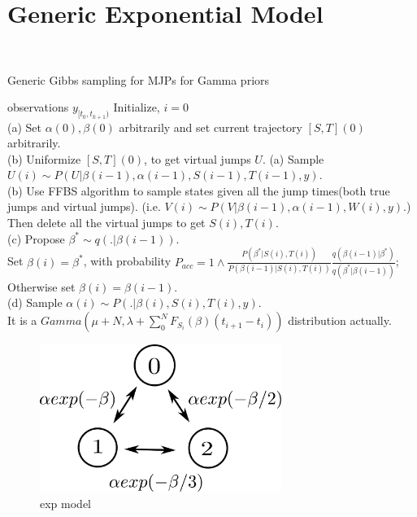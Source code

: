 
\section{Generic Exponential Model}~
\begin{algorithm}[!ht]
   \caption{Generic Gibbs sampling for MJPs for Gamma priors}
   \label{alg:Generic Gibbs}
\begin{algorithmic}
    observations $y_{[t_0, t_{k+1})}$
   \State Initialize, $i = 0$
   \\ (a) Set $\alpha(0), \beta(0)$ arbitrarily and set current trajectory $[S,T](0)$ arbitrarily.\\
    (b) Uniformize $[S,T](0)$, to get virtual jumps $U$.
   \Repeat
    \State (a) Sample $U(i) \sim P( U | \beta(i - 1), \alpha(i - 1), S(i - 1), T(i - 1), y)$.\\	
    \State (b) Use FFBS algorithm to  sample states given all the jump times(both true jumps and virtual jumps).
(i.e. $V(i) \sim P(V |  \beta(i - 1), \alpha(i - 1), W(i ), y).$) Then delete all the virtual jumps to get $S(i), T(i) .$\\
    \State (c) Propose $\beta^* \sim q(.| \beta(i -1))$.\\
      Set $\beta(i) = \beta^*$, with probability $P_{acc} = 1 \wedge \frac{P(\beta^* |S(i), T(i))}{P(\beta(i - 1) |S(i), T(i))} \frac{q(\beta(i - 1)|\beta^*)}{q(\beta^*|\beta(i - 1))}$;\\Otherwise set $\beta(i) = \beta(i-1)$.\\	  
    \State (d) Sample $\alpha(i) \sim P(. | \beta(i), S(i), T(i), y)$.\\ It is a $Gamma(\mu + N, \lambda + \sum_{0}^NF_{S_i}(\beta)(t_{i + 1} - t_i))$ distribution actually.\\
    \EndFor
 \end{algorithmic}
 \end{algorithm}
  \begin{figure}[H]
  \centering
  \begin{minipage}[!hp]{0.45\linewidth}
  \centering
    \includegraphics [width=0.70\textwidth, angle=0]{figs/exp_model.pdf}
      \end{minipage}
    \caption{exp model}
  \end{figure}

